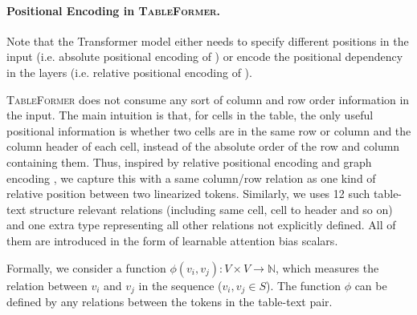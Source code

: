 \documentclass[11pt]{article}
\newcommand{\ag}[1]{{\color{blue} AG: #1}}
\newcommand{\jy}[1]{{\color{red} JY: #1}}
\newcommand{\model}{\textsc{TableFormer}\xspace}
\begin{document}
\paragraph{Positional Encoding in \textsc{TableFormer}.}

Note that the Transformer model either needs to specify different positions in the input (i.e. absolute positional encoding of \citet{vaswani2017attention}) or encode the positional dependency in the layers (i.e. relative positional encoding of \citet{shaw2018self}). 

\model does not consume any sort of column and row order information in the input. The main intuition is that, for cells in the table, the only useful positional information is whether two cells are in the same row or column and the column header of each cell, instead of the absolute order of the row and column containing them. Thus, inspired by relative positional encoding \cite{shaw2018self} and graph encoding \cite{ying2021transformers}, we capture this with a  same column/row relation as one kind of relative position between two linearized tokens. Similarly, we uses 12 such table-text structure relevant relations (including same cell, cell to header and so on) and one extra type representing all other relations not explicitly defined. All of them are introduced in the form of learnable attention bias scalars. 

Formally, we consider a function $\phi (v_i, v_j): V \times V \rightarrow \mathbb{N}$, which measures the relation between $v_i$ and $v_j$ in the sequence ($v_i,v_j\in S$). The function $\phi$ can be defined by any relations between the tokens in the table-text pair. %

\end{document}
